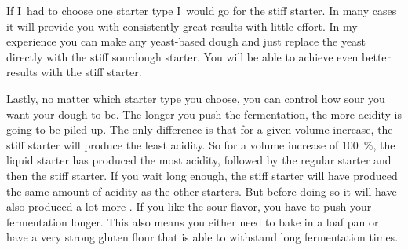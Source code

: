 If I~had to choose one starter type I~would go for the stiff starter. In many cases
it will provide you with consistently great results with little effort.
In my experience you can make any yeast-based dough and just replace
the yeast directly with the stiff sourdough starter. You will be able
to achieve even better results with the stiff starter.

Lastly, no matter which starter type you choose, you can control how sour
you want your dough to be. The longer you push the fermentation, the more
acidity is going to be piled up. The only difference is that for a given
volume increase, the stiff starter will produce the least acidity. So for a
volume increase of \qty{100}{\percent}, the liquid starter has produced the most acidity,
followed by the regular starter and then the stiff starter. If you wait long
enough, the stiff starter will have produced the same amount of acidity as the
other starters. But before doing so it will have also produced a lot more . If
you like the sour flavor, you have to push your fermentation longer. This also
means you either need to bake in a loaf pan or have a very strong gluten flour
that is able to withstand long fermentation times.
